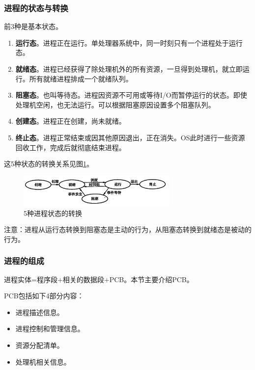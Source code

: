 \documentclass[12pt, a4paper, oneside]{ctexart}
\begin{document}
\subsubsection{进程的状态与转换}

前3种是基本状态。
\begin{enumerate}
  \item {\bf 运行态}。进程正在运行。单处理器系统中，同一时刻只有一个进程处于运行态。
  \item {\bf 就绪态}。进程已经获得了除处理机外的所有资源，一旦得到处理机，就立即运行。所有就绪进程排成一个就绪队列。
  \item {\bf 阻塞态}。也叫等待态。进程因资源不可用或等待I/O而暂停运行的状态。即使处理机空闲，也无法运行。可以根据阻塞原因设置多个阻塞队列。
  \item {\bf 创建态}。进程正在创建，尚未就绪。
  \item {\bf 终止态}。进程正常结束或因其他原因退出，正在消失。OS此时进行一些资源回收工作，完成后就彻底结束进程。
\end{enumerate}

这5种状态的转换关系见图\ref{process_state_transition}。

\begin{figure}
  \centering
  \includegraphics[width=0.7\textwidth]{./images/process_state_transition.png}
  \caption{5种进程状态的转换}
  \label{process_state_transition}
\end{figure}

注意：进程从运行态转换到阻塞态是主动的行为，从阻塞态转换到就绪态是被动的行为。

\subsubsection{进程的组成}

进程实体=程序段+相关的数据段+PCB。本节主要介绍PCB。

PCB包括如下4部分内容：
\begin{itemize}
  \item 进程描述信息。
  \item 进程控制和管理信息。
  \item 资源分配清单。
  \item 处理机相关信息。
\end{itemize}
\end{document}
